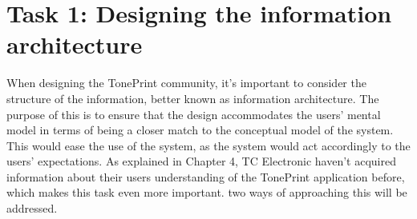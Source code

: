 
\section{Task 1: Designing the information architecture}
\label{Task1}
When designing the TonePrint community, it's important to consider the structure of the information, better known as information architecture. The purpose of this is to ensure that the design accommodates the users' mental model in terms of being a closer match to the conceptual model of the system. This would ease the use of the system, as the system would act accordingly to the users' expectations. As explained in Chapter 4, TC Electronic haven't acquired information about their users understanding of the TonePrint application before, which makes this task even more important. two ways of approaching this will be addressed. \\

